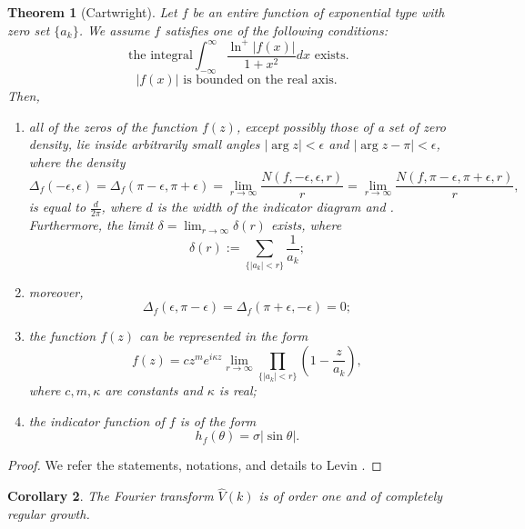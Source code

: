 \documentclass[10pt,a4paper]{article}
\theoremstyle{plain}
\newtheorem{theorem}{Theorem}[section]
\newtheorem{corollary}[theorem]{Corollary}
\theoremstyle{definition}
\theoremstyle{remark}
\numberwithin{equation}{section}
\begin{document}
\begin{theorem}[Cartwright]\label{Cartwright}
Let $f$ be an entire function of exponential type with zero set $\{a_{k}\}$. We assume $f$ satisfies one of the
following conditions:
\begin{equation}\nonumber
\mbox{ the integral
}\int_{-\infty}^\infty\frac{\ln^+|f(x)|}{1+x^2}dx\mbox{ exists}.
\end{equation}
\begin{equation}\nonumber
|f(x)|\mbox{ is bounded on the real axis}.
\end{equation}
Then,
\begin{enumerate}
\item all of the zeros of the function $f(z)$, except possibly
those of a set of zero density, lie inside arbitrarily small
angles $|\arg z|<\epsilon$ and $|\arg z-\pi|<\epsilon$, where the
density
\begin{equation}\label{3.9}
\Delta_f(-\epsilon,\epsilon)=\Delta_f(\pi-\epsilon,\pi+\epsilon)=\lim_{r\rightarrow\infty}
\frac{N(f,-\epsilon,\epsilon,r)}{r}
=\lim_{r\rightarrow\infty}\frac{N(f,\pi-\epsilon,\pi+\epsilon,r)}{r},
\end{equation}
is equal to $\frac{d}{2\pi}$, where $d$ is the width of the
indicator diagram \cite{Boas} and \cite[p.\,251]{Levin}. Furthermore, the limit
$\delta=\lim_{r\rightarrow\infty}\delta(r)$ exists, where
$$
\delta(r):=\sum_{\{|a_k|<r\}}\frac{1}{a_k};
$$
\item moreover,
\begin{equation}\nonumber
\Delta_f(\epsilon,\pi-\epsilon)=\Delta_f(\pi+\epsilon,-\epsilon)=0;
\end{equation}
\item the function $f(z)$ can be represented in the form
\begin{equation}\nonumber
f(z)=cz^me^{i\kappa
z}\lim_{r\rightarrow\infty}\prod_{\{|a_k|<r\}}(1-\frac{z}{a_k}),
\end{equation}
where $c,m,\kappa$ are constants and $\kappa$ is real;
\item the indicator
function of $f$ is of the form
\begin{equation}
h_f(\theta)=\sigma|\sin\theta|.
\end{equation}
\end{enumerate}
\end{theorem}
\begin{proof}
We refer the statements, notations, and details to Levin \cite[p.\,251]{Levin}.
\end{proof}
\begin{corollary}
The Fourier transform $\widehat{V}(k)$ is of order one and of completely regular growth.
\end{corollary}
\end{document}
